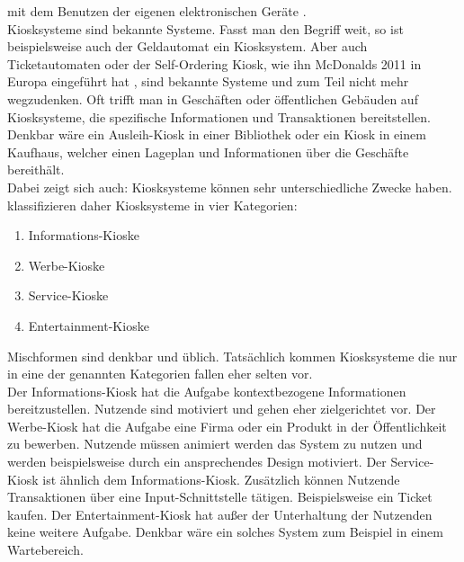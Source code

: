 mit dem Benutzen der eigenen elektronischen Geräte \cite{multimediale}.\\
Kiosksysteme sind bekannte Systeme. Fasst man den Begriff weit, so ist beispielsweise auch der Geldautomat ein Kiosksystem.
Aber auch Ticketautomaten oder der Self-Ordering Kiosk, wie ihn McDonalds 2011 in Europa 
eingeführt hat \cite{mcdonalds}, sind bekannte Systeme und zum Teil nicht mehr wegzudenken. Oft trifft man in 
Geschäften oder öffentlichen Gebäuden auf Kiosksysteme, die spezifische Informationen und Transaktionen 
bereitstellen. Denkbar wäre ein Ausleih-Kiosk in einer Bibliothek oder ein Kiosk in einem Kaufhaus, welcher einen
Lageplan und Informationen über die Geschäfte bereithält.\\
Dabei zeigt sich auch: Kiosksysteme können sehr unterschiedliche Zwecke haben.  klassifizieren daher
Kiosksysteme in vier Kategorien:

\begin{enumerate}
\item Informations-Kioske
\item Werbe-Kioske
\item Service-Kioske
\item Entertainment-Kioske
\end{enumerate}

Mischformen sind denkbar und üblich. Tatsächlich kommen Kiosksysteme die nur in eine der genannten Kategorien fallen
eher selten vor.\\
Der Informations-Kiosk hat die Aufgabe kontextbezogene Informationen bereitzustellen. Nutzende sind motiviert und
gehen eher zielgerichtet vor. 
Der Werbe-Kiosk hat die Aufgabe eine Firma oder ein Produkt in der Öffentlichkeit zu
bewerben. Nutzende müssen animiert werden das System zu nutzen und werden beispielsweise durch ein ansprechendes
Design motiviert.
Der Service-Kiosk ist ähnlich dem Informations-Kiosk. Zusätzlich können Nutzende Transaktionen über eine 
Input-Schnittstelle tätigen. Beispielsweise ein Ticket kaufen.
Der Entertainment-Kiosk hat außer der Unterhaltung der Nutzenden keine weitere Aufgabe. Denkbar wäre ein solches
System zum Beispiel in einem Wartebereich. 